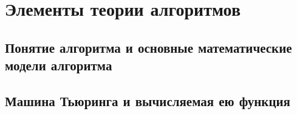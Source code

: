 \section{Элементы теории алгоритмов}
\subsection{Понятие алгоритма и основные математические модели алгоритма}
\subsection{Машина Тьюринга и вычисляемая ею функция}